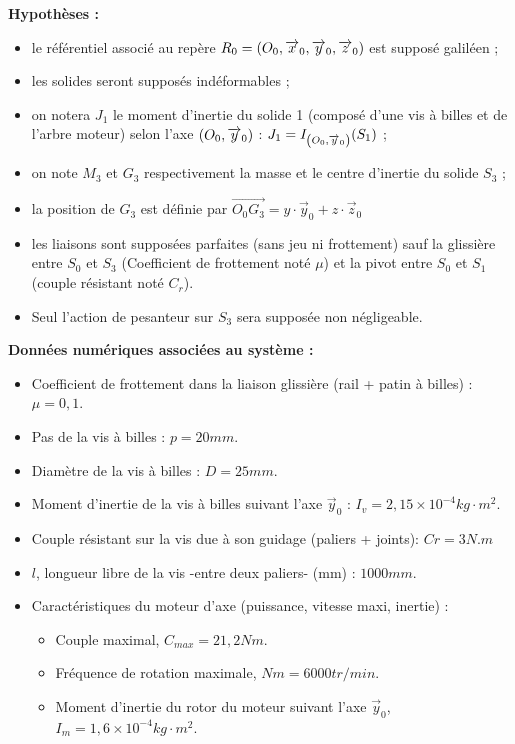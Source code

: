 \documentclass[a4paper,10pt]{article}
\begin{document}
\textbf{Hypothèses :}
\begin{itemize}
\item le référentiel associé au repère $R_0=\left(O_0,\overrightarrow{x}_0,\overrightarrow{y}_0,\overrightarrow{z}_0\right)$ est supposé galiléen ;
\item les solides seront supposés indéformables ; 
\item on notera $J_1$ le moment d'inertie du solide 1 (composé d'une vis à billes et de l'arbre moteur) selon l'axe $\left(O_0,\overrightarrow{y}_0\right)$ : $J_1=I_{\left(O_0,\overrightarrow{y}_0\right)}(S_1)$ ;
\item on note $M_3$ et $G_3$ respectivement la masse et le centre d'inertie du solide $S_3$ ;
\item la position de $G_3$ est définie par $\overrightarrow{O_0G_3}=y\cdot \overrightarrow{y}_0+z\cdot \overrightarrow{z}_0$
\item les liaisons sont supposées parfaites (sans jeu ni frottement) sauf la glissière entre $S_0$ et $S_3$ (Coefficient de frottement noté $\mu$) et la pivot entre $S_0$ et $S_1$ (couple résistant noté $C_r$).
\item Seul l'action de pesanteur sur $S_3$ sera supposée non négligeable.
\end{itemize}



\textbf{Données numériques associées au système :}
\begin{itemize}
\item Coefficient de frottement dans la liaison glissière (rail + patin à billes) : $\mu = 0,1$.
\item Pas de la vis à billes : $p = 20 mm$.
\item Diamètre de la vis à billes : $D =25 mm$.
\item Moment d'inertie de la vis à billes suivant l'axe $\overrightarrow{y}_0$ : $I_v = 2,15 \times 10^{-4} kg\cdot m^2$.
\item Couple résistant sur la vis due à son guidage (paliers + joints): $Cr = 3 N.m$
\item $l$, longueur libre de la vis -entre deux paliers- (mm) : $1000mm$.
\item Caractéristiques du moteur d'axe (puissance, vitesse maxi, inertie) :
\begin{itemize}
\item Couple maximal, $C_{max} = 21,2 Nm$.
\item Fréquence de rotation maximale, $Nm = 6000 tr/min$.
\item Moment d'inertie du rotor du moteur suivant l'axe $\overrightarrow{y}_0$, $I_m = 1,6 \times 10^{-4} kg\cdot m^2$.
\end{itemize}

\end{itemize}
\end{document}
